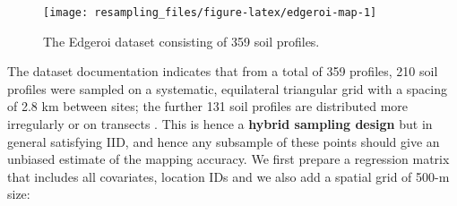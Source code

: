 \documentclass[
  graybox,natbib,nospthms]{svmono}
\begin{document}
\begin{figure}

{\centering \texttt{[image: resampling\_files/figure-latex/edgeroi-map-1]} 

}

\caption{The Edgeroi dataset consisting of 359 soil profiles.}\label{fig:edgeroi-map}
\end{figure}

The dataset documentation indicates that from a total of 359 profiles, 210 soil profiles
were sampled on a systematic, equilateral triangular grid with a spacing of 2.8 km
between sites; the further 131 soil profiles are distributed more irregularly
or on transects \citep{malone2009mapping}. This is hence a \textbf{hybrid sampling design}
but in general satisfying IID, and hence any subsample of these points should give
an unbiased estimate of the mapping accuracy. We first prepare a regression matrix that includes
all covariates, location IDs and we also add a spatial grid of 500-m size:
\end{document}
